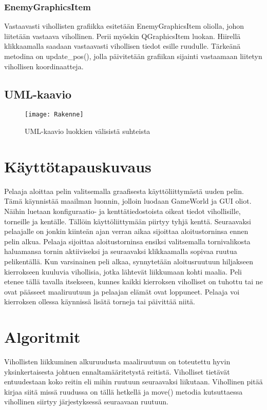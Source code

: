 \documentclass{article}
\begin{document}
\subsubsection{EnemyGraphicsItem}
Vastaavasti vihollisten grafiikka esitetään EnemyGraphicsItem oliolla, johon liitetään vastaava vihollinen. Perii myöskin QGraphicsItem luokan. Hiirellä klikkaamalla saadaan vastaavasti vihollisen tiedot esille ruudulle. Tärkeänä metodina on update\_pos(), jolla päivitetään grafiikan sijainti vastaamaan liitetyn vihollisen koordinaatteja.

\newpage
\subsection{UML-kaavio}
\begin{figure}[H]
    \texttt{[image: Rakenne]}
    \caption{UML-kaavio luokkien välisistä suhteista}
    \label{fig:uml}
\end{figure}

\newpage
\section{Käyttötapauskuvaus}
Pelaaja aloittaa pelin valitsemalla graafisesta käyttöliittymästä uuden pelin. Tämä käynnistää maailman luonnin, jolloin luodaan GameWorld ja GUI oliot. Näihin luetaan konfiguraatio- ja kenttätiedostoista oikeat tiedot vihollisille, torneille ja kentälle. Tällöin käyttöliittymään piirtyy tyhjä kenttä. Seuraavaksi pelaajalle on jonkin kiinteän ajan verran aikaa sijoittaa aloitustorninsa ennen pelin alkua. Pelaaja sijoittaa aloitustorninsa ensiksi valitsemalla tornivalikosta haluamansa tornin aktiiviseksi ja seuraavaksi klikkaamalla sopivaa ruutua pelikentällä. Kun varsinainen peli alkaa, synnytetään aloitusruutuun hiljakseen kierrokseen kuuluvia vihollisia, jotka lähtevät liikkumaan kohti maalia. Peli etenee tällä tavalla itsekseen, kunnes kaikki kierroksen viholliset on tuhottu tai ne ovat päässeet maaliruutuun ja pelaajan elämät ovat loppuneet. Pelaaja voi kierroksen ollessa käynnissä lisätä torneja tai päivittää niitä.

\section{Algoritmit}
Vihollisten liikkuminen alkuruudusta maaliruutuun on toteutettu hyvin yksinkertaisesta johtuen ennaltamääritetystä reitistä. Viholliset tietävät entuudestaan koko reitin eli mihin ruutuun seuraavaksi liikutaan. Vihollinen pitää kirjaa siitä missä ruudussa on tällä hetkellä ja move() metodia kutsuttaessa vihollinen siirtyy järjestyksessä seuraavaan ruutuun.
\end{document}
